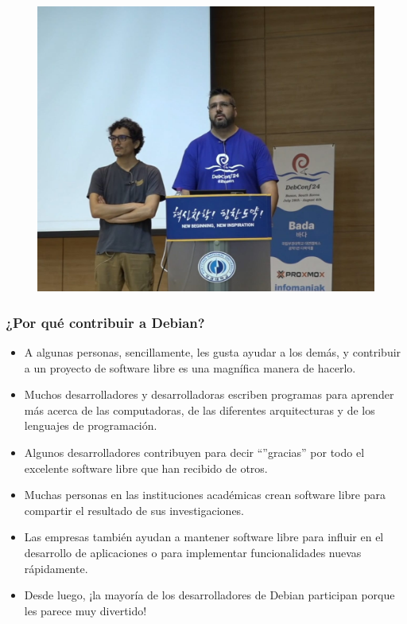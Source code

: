 \documentclass{beamer}
\begin{document}
\begin{frame}
	\begin{figure}
		\centering
		\includegraphics[width=1\linewidth]{images/charla_debian.jpeg}
		\label{fig:debian}
	\end{figure}
\end{frame}

\begin{frame}%
  \frametitle{¿Por qué contribuir a Debian?}
  \begin{itemize}
    \item A algunas personas, sencillamente, les gusta ayudar a los demás, y
      contribuir a un proyecto de software libre es una magnífica manera de
      hacerlo. \pause
    \item Muchos desarrolladores y desarrolladoras escriben programas para
      aprender más acerca de las computadoras, de las diferentes arquitecturas y
      de los lenguajes de programación. \pause
    \item Algunos desarrolladores contribuyen para decir ``''gracias'' por todo
      el excelente software libre que han recibido de otros. \pause
    \item Muchas personas en las instituciones académicas crean software libre
      para compartir el resultado de sus investigaciones. \pause
    \item Las empresas también ayudan a mantener software libre para influir en
      el desarrollo de aplicaciones o para implementar funcionalidades nuevas
      rápidamente. \pause
    \item Desde luego, ¡la mayoría de los desarrolladores de Debian participan
      porque les parece muy divertido!
  \end{itemize}
\end{frame}
\end{document}
